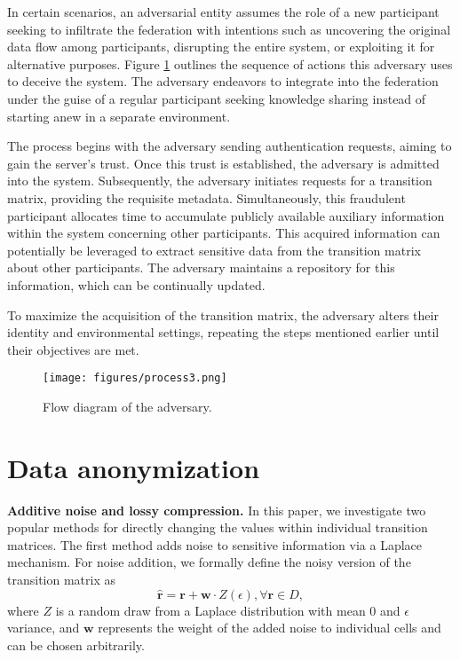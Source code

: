 \documentclass{article}
\begin{document}
 In certain scenarios, an adversarial entity assumes the role of a new participant seeking to infiltrate the federation with intentions such as uncovering the original data flow among participants, disrupting the entire system, or exploiting it for alternative purposes. Figure \ref{fig:process3} outlines the sequence of actions this adversary uses to deceive the system. The adversary endeavors to integrate into the federation under the guise of a regular participant seeking knowledge sharing instead of starting anew in a separate environment.

The process begins with the adversary sending authentication requests, aiming to gain the server's trust. Once this trust is established, the adversary is admitted into the system. Subsequently, the adversary initiates requests for a transition matrix, providing the requisite metadata. Simultaneously, this fraudulent participant allocates time to accumulate publicly available auxiliary information within the system concerning other participants. This acquired information can potentially be leveraged to extract sensitive data from the transition matrix about other participants. The adversary maintains a repository for this information, which can be continually updated.

To maximize the acquisition of the transition matrix, the adversary alters their identity and environmental settings, repeating the steps mentioned earlier until their objectives are met.


\begin{figure}
    \centering
   \texttt{[image: figures/process3.png]}
    \caption{Flow diagram of the adversary.}
    \label{fig:process3}
\end{figure}




\section{Data anonymization}\label{sec:data_anym}

\textbf{Additive noise and lossy compression.} In this paper, we investigate two popular methods for directly changing the values within individual transition matrices. The first method adds noise to sensitive information via a Laplace mechanism. For noise addition, we formally define the noisy version of the transition matrix as
\begin{equation}
    \hat{\mathbf{r}} = \mathbf{r} + \mathbf{w}\cdot Z(\epsilon), \forall \mathbf{r} \in D,
\end{equation}
where $Z$ is a random draw from a Laplace distribution with mean $0$ and $\epsilon$ variance, and  $\mathbf{w}$ represents the weight of the added noise to individual cells and can be chosen arbitrarily.
\end{document}
